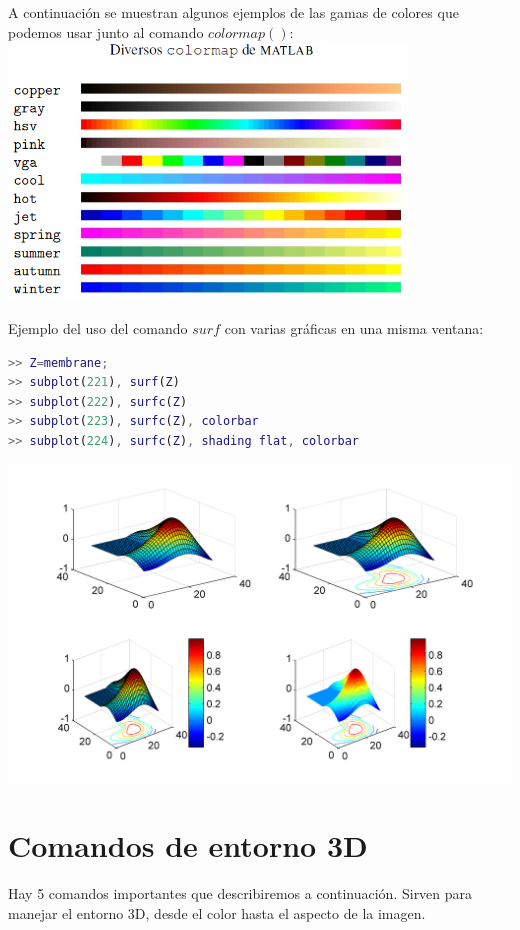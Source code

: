 A continuación se muestran algunos ejemplos de las gamas de colores que podemos usar junto al comando $colormap()$:
\includegraphics[width=300pt]{./Imagenes/3d4.png}

Ejemplo del uso del comando $surf$ con varias gráficas en una misma ventana:
\begin{lstlisting}[language=Matlab]
>> Z=membrane;
>> subplot(221), surf(Z)
>> subplot(222), surfc(Z)
>> subplot(223), surfc(Z), colorbar
>> subplot(224), surfc(Z), shading flat, colorbar
\end{lstlisting}

\includegraphics[width=400pt]{./Imagenes/3d5.png}

\section{Comandos de entorno 3D}

Hay 5 comandos importantes que describiremos a continuación. Sirven para manejar el entorno 3D, desde el color hasta el aspecto de la imagen.

